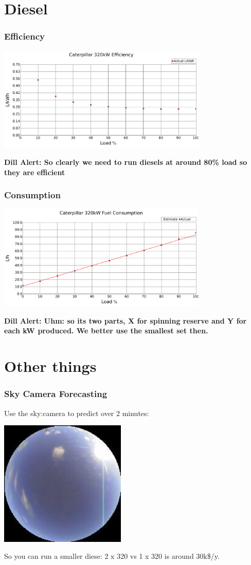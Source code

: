 \documentclass{beamer}
\def\dill#1{\textcolor{RawSienna}{\textbf{Dill Alert: #1}}}
\begin{document}
\section{Diesel}
\begin{frame}\frametitle{Efficiency}
\includegraphics[width=10cm]{limits/figFuelCurve1.pdf}

\dill{So clearly we need to run diesels at around 80\% load 
  so they are efficient}
\end{frame}

\begin{frame}\frametitle{Consumption}
\includegraphics[width=10cm]{limits/figFuelCurve2.pdf}

\dill{Uhm: so its two parts, X for spinning reserve and
  Y for each kW produced. We better use the smallest set then.}
\end{frame}

\section{Other things}
\begin{frame}\frametitle{Sky Camera Forecasting}
Use the sky:camera to predict over 2 minutes:

\includegraphics[width=6cm]{batch-2014-07-28T165557+0930-basis.jpg}

So you can run a smaller diese: 2 x 320 vs 1 x 320 is around 30k\$/y.
\end{frame}
\end{document}

